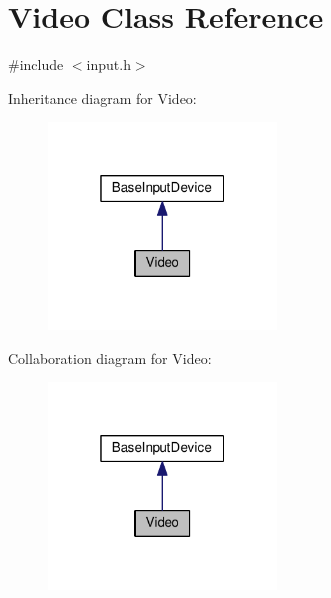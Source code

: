 \hypertarget{classVideo}{}\section{Video Class Reference}
\label{classVideo}


{\ttfamily \#include $<$input.\+h$>$}



Inheritance diagram for Video\+:
\nopagebreak
\begin{figure}[H]
\begin{center}
\leavevmode
\includegraphics[width=172pt]{classVideo__inherit__graph}
\end{center}
\end{figure}


Collaboration diagram for Video\+:
\nopagebreak
\begin{figure}[H]
\begin{center}
\leavevmode
\includegraphics[width=172pt]{classVideo__coll__graph}
\end{center}
\end{figure}
